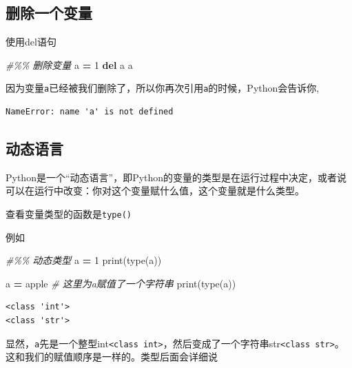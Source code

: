 \documentclass[
]{book}
\newenvironment{Shaded}{\begin{snugshade}}{\end{snugshade}}
\newcommand{\BuiltInTok}[1]{#1}
\newcommand{\CommentTok}[1]{\textcolor[rgb]{0.56,0.35,0.01}{\textit{#1}}}
\newcommand{\DecValTok}[1]{\textcolor[rgb]{0.00,0.00,0.81}{#1}}
\newcommand{\KeywordTok}[1]{\textcolor[rgb]{0.13,0.29,0.53}{\textbf{#1}}}
\newcommand{\NormalTok}[1]{#1}
\newcommand{\OperatorTok}[1]{\textcolor[rgb]{0.81,0.36,0.00}{\textbf{#1}}}
\newcommand{\StringTok}[1]{\textcolor[rgb]{0.31,0.60,0.02}{#1}}
\begin{document}
\hypertarget{ux5220ux9664ux4e00ux4e2aux53d8ux91cf}{%
\subsection{删除一个变量}\label{ux5220ux9664ux4e00ux4e2aux53d8ux91cf}}

使用del语句

\begin{Shaded}
\begin{Highlighting}[]
\CommentTok{\#\%\% 删除变量}
\NormalTok{a }\OperatorTok{=} \DecValTok{1}
\KeywordTok{del}\NormalTok{ a}
\NormalTok{a}
\end{Highlighting}
\end{Shaded}

因为变量\texttt{a}已经被我们删除了，所以你再次引用\texttt{a}的时候，Python会告诉你,

\begin{verbatim}
NameError: name 'a' is not defined
\end{verbatim}

\hypertarget{ux52a8ux6001ux8bedux8a00}{%
\subsection{动态语言}\label{ux52a8ux6001ux8bedux8a00}}

Python是一个``动态语言''，即Python的变量的类型是在运行过程中决定，或者说可以在运行中改变：你对这个变量赋什么值，这个变量就是什么类型。

查看变量类型的函数是\texttt{type()}

例如

\begin{Shaded}
\begin{Highlighting}[]
\CommentTok{\#\%\% 动态类型}
\NormalTok{a }\OperatorTok{=} \DecValTok{1} 
\BuiltInTok{print}\NormalTok{(}\BuiltInTok{type}\NormalTok{(a))}

\NormalTok{a }\OperatorTok{=} \StringTok{\textquotesingle{}apple\textquotesingle{}} \CommentTok{\# 这里为a赋值了一个字符串}
\BuiltInTok{print}\NormalTok{(}\BuiltInTok{type}\NormalTok{(a))}
\end{Highlighting}
\end{Shaded}

\begin{verbatim}
<class 'int'>
<class 'str'>
\end{verbatim}

显然，\texttt{a}先是一个整型int\texttt{\textless{}class\ \textquotesingle{}int\textquotesingle{}\textgreater{}}，然后变成了一个字符串str\texttt{\textless{}class\ \textquotesingle{}str\textquotesingle{}\textgreater{}}。
这和我们的赋值顺序是一样的。类型后面会详细说
\end{document}
